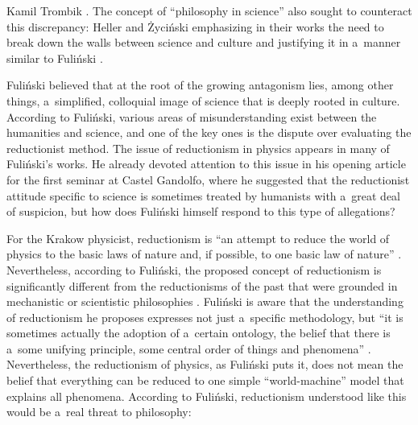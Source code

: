 \begin{artengenv}{Kamil Trombik}
{%
 \parencite[][p.154]{fulinski_glos_1995}.
 }
 The concept of ``philosophy in science'' also sought to counteract this discrepancy: Heller and Życiński emphasizing in their works the need to break down the walls between science and culture and justifying it in a~manner similar to Fuliński 
\parencites[][]{zycinski_trzy_1990}[][]{heller_czy_1998}.%




Fuliński believed that at the root of the growing antagonism lies, among other things, a~simplified, colloquial image of science that is deeply rooted in culture. According to Fuliński, various areas of misunderstanding exist between the humanities and science, and one of the key ones is the dispute over evaluating the reductionist method. The issue of reductionism in physics appears in many of Fuliński's works. He already devoted attention to this issue in his opening article for the first seminar at Castel Gandolfo, where he suggested that the reductionist attitude specific to science is sometimes treated by humanists with a~great deal of suspicion, but how does Fuliński himself respond to this type of allegations?



For the Krakow physicist, reductionism is ``an attempt to reduce the world of physics to the basic laws of nature and, if possible, to one basic law of nature''
\parencite[][p.187]{heller_watpliwosci_1990}. %
 Nevertheless, according to Fuliński, the proposed concept of reductionism is significantly different from the reductionisms of the past that were grounded in mechanistic or scientistic philosophies 
\parencites[][]{fulinski_o_1993}[][]{heller_jednosc_2003-2}. %
 Fuliński is aware that the understanding of reductionism he proposes expresses not just a~specific methodology, but ``it is sometimes actually the adoption of a~certain ontology, the belief that there is a~some unifying principle, some central order of things and phenomena''
\parencite[][p.36]{janik_czesc_1990}. %
 Nevertheless, the reductionism of physics, as Fuliński puts it, does not mean the belief that everything can be reduced to one simple ``world-machine'' model that explains all phenomena. According to Fuliński, reductionism understood like this would be a~real threat to philosophy:




\end{artengenv}
